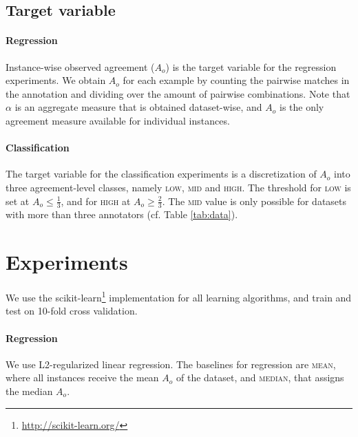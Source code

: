 \documentclass[11pt,a4paper]{article}
\begin{document}
\subsection{Target variable}
\label{sec:targetvariable}
\paragraph*{Regression} Instance-wise observed agreement ($A_o$) is the target variable for the regression experiments. We obtain  $A_o$ for each example by counting the pairwise matches in the annotation and dividing over the amount of pairwise combinations. 
Note that  $\alpha$ is an aggregate measure that is obtained dataset-wise, and $A_o$ is the only agreement measure available for individual instances.

\paragraph*{Classification} The target variable for the classification experiments is a discretization of $A_o$ into three agreement-level classes, namely \textsc{low}, \textsc{mid} and \textsc{high}. The threshold for \textsc{low} is set at $A_o \le \frac{1}{3}$, and for \textsc{high} at $A_o \ge \frac{2}{3}$. The \textsc{mid} value is only possible for datasets with more than three annotators (cf. Table \ref{tab:data}).



\section{Experiments}
We use the scikit-learn\footnote{\url{http://scikit-learn.org/}} implementation for all learning algorithms, and train and test on 10-fold cross validation.
\paragraph{Regression} We use L2-regularized linear regression. 
The baselines for regression are \textsc{mean}, where all instances receive the mean $A_o$ of the dataset, and  \textsc{median}, that assigns the median $A_o$. 
\end{document}
